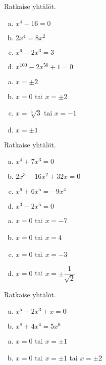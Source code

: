 \begin{tehtava}
    Ratkaise yhtälöt.
    \begin{enumerate}[a)]
        \item $x^4 - 16 = 0$
        \item $2x^4 = 8x^2$
        \item $x^6 - 2x^3 = 3$
        \item $x^{100} - 2x^{50} + 1 = 0$
    \end{enumerate}
    \begin{vastaus}
        \begin{enumerate}[a)]
            \item $x = \pm2$
            \item $x = 0$ tai $x=\pm2$
            \item $x = \sqrt[3]{3}$ tai $x= -1$
            \item $x = \pm1$
        \end{enumerate}
    \end{vastaus}
\end{tehtava}

\begin{tehtava}
    Ratkaise yhtälöt.
    \begin{enumerate}[a)]
        \item $x^4 + 7x^3 = 0$
        \item $2x^3 - 16x^2 + 32x = 0$
        \item $x^6 + 6x^5 = -9x^4$
        \item $x^3 - 2x^5 = 0$      
    \end{enumerate}
    \begin{vastaus}
        \begin{enumerate}[a)]
        	\item $x = 0$ tai $x = -7$
        	\item $x = 0$ tai $x = 4$
        	\item $x = 0$ tai $x = -3$
            \item $x = 0$ tai $x = \pm\dfrac{1}{\sqrt{2}}$
        \end{enumerate}
    \end{vastaus}
\end{tehtava}

\begin{tehtava}
    Ratkaise yhtälöt.
    \begin{enumerate}[a)]
        \item $x^5 - 2x^3 + x = 0$
        \item $x^8 + 4x^4 = 5x^6$       
    \end{enumerate}
    \begin{vastaus}
        \begin{enumerate}[a)]
        	\item $x = 0$ tai $x = \pm1$
        	\item $x = 0$ tai $x = \pm1$ tai $x = \pm2$
        \end{enumerate}
    \end{vastaus}
\end{tehtava}

